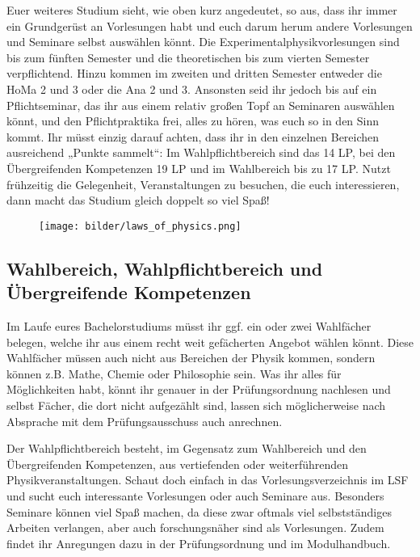 Euer weiteres Studium sieht, wie oben kurz angedeutet, so aus, dass ihr immer ein Grundgerüst an Vorlesungen habt und euch darum herum andere Vorlesungen und Seminare selbst auswählen könnt. Die Experimentalphysikvorlesungen sind bis zum fünften Semester und die theoretischen bis zum vierten Semester verpflichtend. Hinzu kommen im zweiten und dritten Semester entweder die \gls{HoMa} 2 und 3 oder die \gls{Ana} 2 und 3. Ansonsten seid ihr jedoch bis auf ein Pflichtseminar, das ihr aus einem relativ großen Topf an Seminaren auswählen könnt, und den Pflichtpraktika frei, alles zu hören, was euch so in den Sinn kommt. Ihr müsst einzig darauf achten, dass ihr in den einzelnen Bereichen ausreichend „Punkte sammelt“: Im Wahlpflichtbereich sind das 14 \gls{LP}, bei den Übergreifenden Kompetenzen 19 \gls{LP} und im Wahlbereich bis zu 17 \gls{LP}. Nutzt frühzeitig die Gelegenheit, Veranstaltungen zu besuchen, die euch interessieren, dann macht das Studium gleich doppelt so viel Spaß!

\begin{figure}[b]
	\centering
	\texttt{[image: bilder/laws\_of\_physics.png]}
\end{figure}
\vfill \eject

\subsection{Wahlbereich, Wahlpflichtbereich und \\Übergreifende Kompetenzen}

Im Laufe eures Bachelorstudiums müsst ihr ggf. ein oder zwei Wahlfächer belegen, welche ihr aus einem recht weit gefächerten Angebot wählen könnt. Diese Wahlfächer müssen auch nicht aus Bereichen der Physik kommen, sondern können z.B. Mathe, Chemie oder Philosophie sein. Was ihr alles für Möglichkeiten habt, könnt ihr genauer in der Prüfungsordnung nachlesen und selbst Fächer, die dort nicht aufgezählt sind, lassen sich möglicherweise nach Absprache mit dem Prüfungsausschuss auch anrechnen.

Der Wahlpflichtbereich besteht, im Gegensatz zum Wahlbereich und den Übergreifenden Kompetenzen, aus vertiefenden oder weiterführenden Physikveranstaltungen. Schaut doch einfach in das Vorlesungsverzeichnis im LSF und sucht euch interessante Vorlesungen oder auch Seminare aus. Besonders Seminare können viel Spaß machen, da diese zwar oftmals viel selbstständiges Arbeiten verlangen, aber auch forschungsnäher sind als Vorlesungen. Zudem findet ihr Anregungen dazu in der Prüfungsordnung und im Modulhandbuch.

